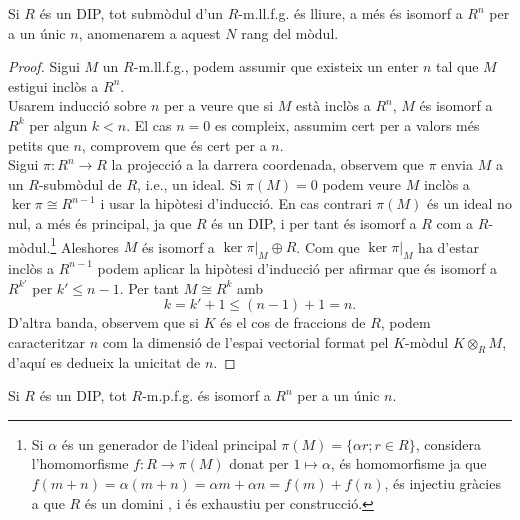 \begin{theorem}[] \label{defRangDIP}
Si $R$ és un DIP, tot submòdul d'un $R$-m.ll.f.g. és lliure, a més és isomorf a $R^n$ per a un únic $n$, anomenarem a aquest $N$ rang del mòdul.
\end{theorem}
\begin{proof}
Sigui $M$ un $R$-m.ll.f.g., podem assumir que existeix un enter $n$ tal que $M$ estigui inclòs a $R^n$. \\ Usarem inducció sobre $n$ per a veure que si $M$ està inclòs a $R^n$, $M$ és isomorf a $R^k$ per algun $k<n$. 
El cas $n=0$ es compleix, assumim cert per a valors més petits que $n$, comprovem que és cert per a $n$. \\
Sigui $\pi: R^n \rightarrow R$ la projecció a la darrera coordenada, observem que $\pi$ envia $M$ a un $R$-submòdul de $R$, i.e., un ideal. Si $\pi(M)=0$ podem veure $M$ inclòs a $\ker \pi \cong R^{n-1}$ i usar la hipòtesi d'inducció. En cas contrari $\pi(M)$ és un ideal no nul, a més és principal, ja que $R$ és un DIP, i per tant és isomorf a $R$ com a $R$-mòdul.\footnote{Si $\alpha$ és un generador de l'ideal principal $\pi(M)=\{\alpha r ; r\in R\}$, considera l'homomorfisme $f:R\rightarrow \pi(M)$ donat per $1\mapsto \alpha$, és homomorfisme ja que $f(m+n)=\alpha(m+n) = \alpha m + \alpha n = f(m)+f(n)$, és injectiu gràcies a que $R$ és un domini , i és exhaustiu per construcció.} Aleshores $M$ és isomorf a $\ker \pi |_M \oplus R$. Com que $\ker \pi |_M$ ha d'estar inclòs a $R^{n-1}$ podem aplicar la hipòtesi d'inducció per afirmar que és isomorf a $R^{k'}$ per $k'\leq n-1$. Per tant $M\cong R^k$ amb $$k=k'+1\leq (n-1)+1=n.$$ 
D'altra banda, observem que si $K$ és el cos de fraccions de $R$, podem caracteritzar $n$ com la dimensió de l'espai vectorial format pel $K$-mòdul $K \otimes_R M$, d'aquí es dedueix la unicitat de $n$.

\end{proof}

\begin{cor} \label{RD}
Si $R$ és un DIP, tot $R$-m.p.f.g. és isomorf a $R^n$ per a un únic $n$.
\end{cor}


